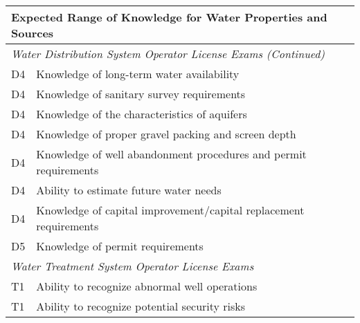 \newpage



\begin{table}[H]
\begin{tabular}{| m{1cm} |m{15cm} |}
\hline
\multicolumn{2}{|l|}{\textbf{Expected   Range of Knowledge for Water Properties and Sources}}                                                                      \\ \hline
\multicolumn{2}{|l|}{\textit{Water   Distribution System Operator License Exams (Continued)}}                                                                  \\ \hline
D4 & Knowledge of long-term water availability                                                                                         \\ \hline
D4 & Knowledge of sanitary survey requirements                                                                                         \\ \hline
D4 & Knowledge of the characteristics of   aquifers                                                                                    \\ \hline
D4 & Knowledge of proper gravel packing and   screen depth                                                                             \\ \hline
D4 & Knowledge of well abandonment procedures and   permit requirements                                                                \\ \hline
D4 & Ability to estimate future water needs                                                                                            \\ \hline
D4 & Knowledge of capital improvement/capital   replacement requirements                                                               \\ \hline
D5 & Knowledge of permit   requirements                                                                                                \\ \hline
\multicolumn{2}{|l|}{\textit{Water   Treatment System Operator License Exams}}                                                                  \\ \hline
T1 & Ability to recognize   abnormal well operations                                                                                   \\ \hline
T1 & Ability to recognize   potential security risks                                                                                   \\ \hline

\end{tabular}
\end{table}
